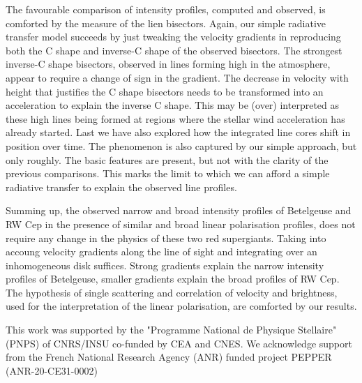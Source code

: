 \documentclass{/Users/art2/TeX/aanda/aa}
\begin{document}
The favourable comparison of intensity profiles, computed and observed, is comforted by the measure of the lien bisectors. Again, our simple radiative 
transfer model succeeds by just tweaking the velocity gradients in reproducing both the C shape and inverse-C shape of the observed bisectors. The 
strongest inverse-C shape bisectors, observed in lines forming high in the atmosphere, appear to require a change of sign in the gradient. The decrease 
in velocity with height that justifies the C shape bisectors needs to be transformed into an acceleration to explain the inverse C shape. This may 
be (over) interpreted as these high lines being formed at regions where the stellar wind acceleration has already started.  Last we have also 
explored how the integrated line cores shift in position over time. The phenomenon is also captured by our simple approach, but only roughly. The basic 
features are present, but not with the clarity of the previous comparisons. This marks the limit to which we can afford a simple radiative transfer 
to explain the observed line profiles.

Summing up, the observed  narrow and broad intensity profiles of Betelgeuse and RW Cep in the presence of similar and broad linear polarisation 
profiles, does not require any change in the physics of these two red supergiants. Taking into accoung velocity gradients along the line of sight 
and integrating over an inhomogeneous disk suffices. Strong gradients explain the narrow intensity profiles of Betelgeuse, smaller gradients explain 
the broad profiles of RW Cep. The hypothesis of single scattering and correlation of velocity and brightness, used for the interpretation of the 
linear polarisation, are comforted by our results.




\begin{acknowledgements}
This work was supported by the "Programme National de Physique Stellaire" (PNPS) of CNRS/INSU co-funded by CEA and CNES.
We acknowledge support from the French National Research Agency (ANR)
funded project PEPPER (ANR-20-CE31-0002)
\end{acknowledgements}


%



 
\end{document}
